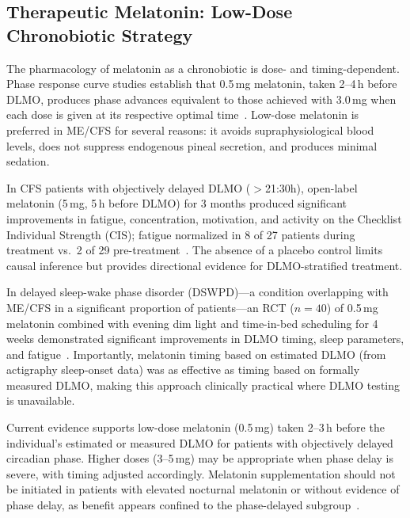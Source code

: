 \subsection{Therapeutic Melatonin: Low-Dose Chronobiotic Strategy}

The pharmacology of melatonin as a chronobiotic is dose- and timing-dependent. Phase response curve studies establish that 0.5\,mg melatonin, taken 2--4\,h before DLMO, produces phase advances equivalent to those achieved with 3.0\,mg when each dose is given at its respective optimal time~\cite{Burgess2010melatonin}. Low-dose melatonin is preferred in ME/CFS for several reasons: it avoids supraphysiological blood levels, does not suppress endogenous pineal secretion, and produces minimal sedation.

In CFS patients with objectively delayed DLMO ($>$21:30h), open-label melatonin (5\,mg, 5\,h before DLMO) for 3 months produced significant improvements in fatigue, concentration, motivation, and activity on the Checklist Individual Strength (CIS); fatigue normalized in 8 of 27 patients during treatment vs.~2 of 29 pre-treatment~\cite{vanHeukelom2006melatonin}. The absence of a placebo control limits causal inference but provides directional evidence for DLMO-stratified treatment.

In delayed sleep-wake phase disorder (DSWPD)---a condition overlapping with ME/CFS in a significant proportion of patients---an RCT ($n=40$) of 0.5\,mg melatonin combined with evening dim light and time-in-bed scheduling for 4 weeks demonstrated significant improvements in DLMO timing, sleep parameters, and fatigue~\cite{Swanson2024DLMO}. Importantly, melatonin timing based on estimated DLMO (from actigraphy sleep-onset data) was as effective as timing based on formally measured DLMO, making this approach clinically practical where DLMO testing is unavailable.

\begin{observation}
\label{obs:ch15-melatonin-dosing}
Current evidence supports low-dose melatonin (0.5\,mg) taken 2--3\,h before the individual's estimated or measured DLMO for patients with objectively delayed circadian phase. Higher doses (3--5\,mg) may be appropriate when phase delay is severe, with timing adjusted accordingly. Melatonin supplementation should not be initiated in patients with elevated nocturnal melatonin or without evidence of phase delay, as benefit appears confined to the phase-delayed subgroup~\cite{vanHeukelom2006melatonin,Knook2000melatonin,williams2002therapy}.
\end{observation}

